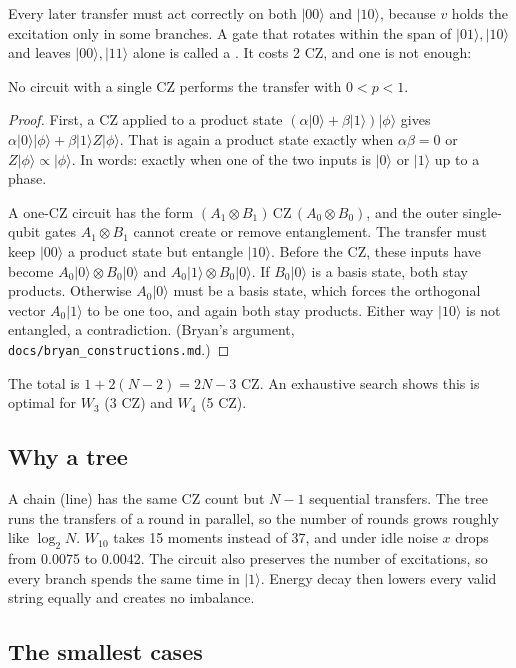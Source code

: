 \documentclass[11pt]{scrartcl}
\newcommand{\ket}[1]{\lvert #1\rangle}
\newcommand{\CZ}{\ensuremath{\mathrm{CZ}}}
\newcommand{\file}[1]{\texttt{\small #1}}
\begin{document}
Every later transfer must act correctly on both $\ket{00}$ and $\ket{10}$, because $v$ holds the
excitation only in some branches. A gate that rotates within the span of $\ket{01},\ket{10}$ and
leaves $\ket{00},\ket{11}$ alone is called a . It costs 2 \CZ{}, and one is
not enough:

\begin{claim}
  No circuit with a single \CZ{} performs the transfer with $0<p<1$.
\end{claim}
\begin{proof}
  First, a \CZ{} applied to a product state $(\alpha\ket0+\beta\ket1)\ket\phi$ gives
  $\alpha\ket0\ket\phi+\beta\ket1Z\ket\phi$. That is again a product state exactly when
  $\alpha\beta=0$ or $Z\ket\phi\propto\ket\phi$. In words: exactly when one of the two inputs is
  $\ket0$ or $\ket1$ up to a phase.

  A one-\CZ{} circuit has the form $(A_1\otimes B_1)\,\CZ\,(A_0\otimes B_0)$, and the outer
  single-qubit gates $A_1\otimes B_1$ cannot create or remove entanglement. The transfer must keep
  $\ket{00}$ a product state but entangle $\ket{10}$. Before the \CZ{}, these inputs have become
  $A_0\ket0\otimes B_0\ket0$ and $A_0\ket1\otimes B_0\ket0$. If $B_0\ket0$ is a basis state, both
  stay products. Otherwise $A_0\ket0$ must be a basis state, which forces the orthogonal vector
  $A_0\ket1$ to be one too, and again both stay products. Either way $\ket{10}$ is not entangled, a
  contradiction. (Bryan's argument, \file{docs/bryan\_constructions.md}.)
\end{proof}

The total is $1+2(N-2)=2N-3$ \CZ. An exhaustive search shows this is optimal for $W_3$ (3 \CZ) and
$W_4$ (5 \CZ).

\subsection{Why a tree}

A chain (line) has the same \CZ{} count but $N-1$ sequential transfers. The tree runs the transfers
of a round in parallel, so the number of rounds grows roughly like $\log_2 N$. $W_{10}$ takes 15
moments instead of 37, and under idle noise $x$ drops from 0.0075 to 0.0042. The circuit also
preserves the number of excitations, so every branch spends the same time in $\ket1$. Energy decay
then lowers every valid string equally and creates no imbalance.

\subsection{The smallest cases}
\end{document}
